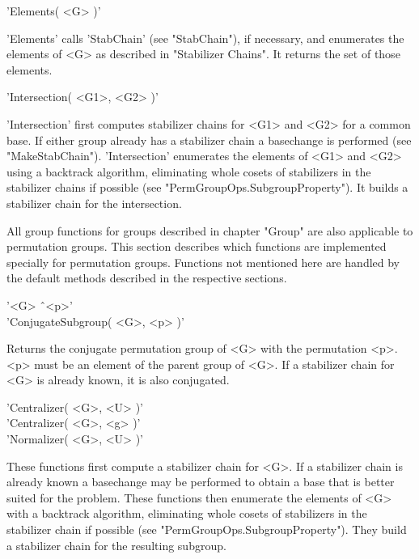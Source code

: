 \vspace{5mm}
'Elements( <G> )'%

'Elements' calls 'StabChain' (see "StabChain"), if necessary, and
enumerates the  elements of <G> as described in "Stabilizer  Chains".  It
returns the set of those elements.

\vspace{5mm}
'Intersection( <G1>, <G2> )'%

'Intersection' first computes  stabilizer chains for <G1> and <G2>  for a
common base.  If either group already has a stabilizer chain a basechange
is  performed  (see  "MakeStabChain").   'Intersection'  enumerates   the
elements of <G1> and <G2> using a backtrack  algorithm, eliminating whole
cosets  of   stabilizers  in  the  stabilizer  chains  if  possible  (see
"PermGroupOps.SubgroupProperty").  It builds a  stabilizer  chain for the
intersection.


All group functions  for groups  described  in chapter  "Group"  are also
applicable to permutation groups.  This section describes which functions
are   implemented  specially  for   permutation  groups.   Functions  not
mentioned  here  are handled  by the  default  methods described  in  the
respective sections.

\vspace{5mm}
'<G> \^\ <p>' \\
'ConjugateSubgroup( <G>, <p> )'%

Returns the conjugate permutation group of  <G> with the permutation <p>.
<p> must be an element of the parent group of <G>.  If a stabilizer chain
for <G> is already known, it is also conjugated.

\vspace{5mm}
'Centralizer( <G>, <U> )'%
 \\
'Centralizer( <G>, <g> )' \\
'Normalizer( <G>, <U> )'%

These  functions  first  compute  a  stabilizer  chain  for  <G>.   If  a
stabilizer chain is already known a basechange may be performed to obtain
a  base  that  is  better suited for the  problem.  These functions  then
enumerate the  elements  of  <G> with a backtrack algorithm,  eliminating
whole  cosets  of  stabilizers  in the  stabilizer chain if possible (see
"PermGroupOps.SubgroupProperty").  They build  a stabilizer chain for the
resulting subgroup.

